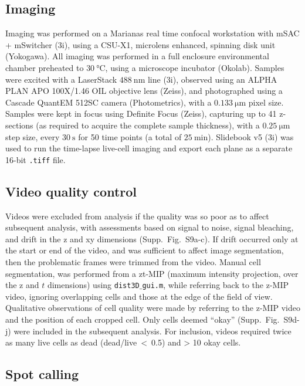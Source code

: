 \documentclass[9pt,twocolumn,twoside,lineno]{pnas-new}
\begin{document}
\subsection*{Imaging}


Imaging was performed on a Marianas real time confocal workstation with mSAC +
mSwitcher (3i), using a CSU-X1, microlens enhanced, spinning disk unit
(Yokogawa). All imaging was performed in a full enclosure environmental chamber
preheated to $\SI{30}{\celsius}$, using a microscope incubator (Okolab). Samples
were excited with a LaserStack $\SI{488}{\nm}$ line (3i), observed using an
ALPHA PLAN APO 100X/1.46 OIL objective lens (Zeiss), and photographed using a
Cascade QuantEM 512SC camera (Photometrics), with a $\SI{0.133}{\um}$ pixel
size. Samples were kept in focus using Definite Focus (Zeiss), capturing up to 41
z-sections (as required to acquire the complete sample thickness), with a $\SI{0.25}{\um}$ step size, every
$\SI{30}{\second}$ for 50 time points (a total of $\SI{25}{\minute}$). Slidebook
v5 (3i) was used to run the time-lapse live-cell imaging and export each plane
as a separate 16-bit \texttt{.tiff} file.


\subsection*{Video quality control}


Videos were excluded from analysis if the quality was so poor as to affect
subsequent analysis, with assessments based on signal to noise, signal
bleaching, and drift in the z and xy dimensions (Supp.\ Fig.\ S9a-c). If drift occurred
only at the start or end of the video, and was sufficient to affect image
segmentation, then the problematic frames were trimmed from the video. Manual
cell segmentation, was performed from a zt-MIP (maximum intensity projection,
over the z and $t$ dimensions) using \texttt{dist3D$\_$gui.m}, while referring
back to the z-MIP video, ignoring overlapping cells and those at the edge of the
field of view. Qualitative observations of cell quality were made by referring
to the z-MIP video and the position of each cropped cell. Only cells deemed
``okay'' (Supp.\ Fig.\ S9d-j) were included in the subsequent analysis. For inclusion,
videos required twice as many live cells as dead (dead/live~\textless{}~0.5) and
\textgreater{} 10 okay cells.

\subsection*{Spot calling}
\end{document}
